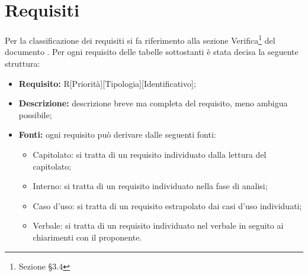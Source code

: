 \section{Requisiti}
Per la classificazione dei requisiti si fa riferimento alla sezione Verifica\footnote{Sezione §3.4} del documento .
Per ogni requisito delle tabelle sottostanti è stata decisa la seguente struttura: 
\begin{itemize}
\item\textbf{Requisito:} R[Priorità][Tipologia][Identificativo];
\item\textbf{Descrizione:} descrizione breve ma completa del requisito, meno ambigua possibile;
\item\textbf{Fonti:} ogni requisito può derivare dalle seguenti fonti:
	\begin{itemize}
		\item Capitolato: si tratta di un requisito individuato dalla lettura del capitolato;
		\item Interno: si tratta di un requisito individuato nella fase di analisi;
		\item Caso d'uso: si tratta di un requisito estrapolato dai casi d'uso individuati;
		\item Verbale: si tratta di un requisito individuato nel verbale in seguito ai chiarimenti con il proponente.
	\end{itemize}
\end{itemize}


